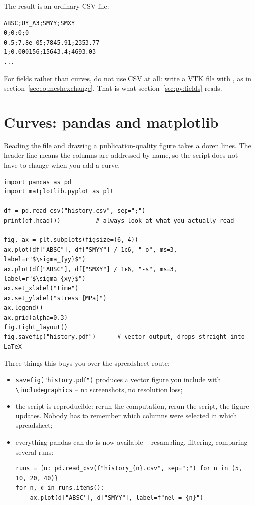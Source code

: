 \noindent The result is an ordinary CSV file:

\begin{codebox}
\begin{verbatim}
ABSC;UY_A3;SMYY;SMXY
0;0;0;0
0.5;7.8e-05;7845.91;2353.77
1;0.000156;15643.4;4693.03
...
\end{verbatim}
\end{codebox}

\noindent For fields rather than curves, do not use CSV at all: write a VTK
file with , as in section~\ref{sec:io:meshexchange}. That is
what section~\ref{sec:py:fields} reads.

\section{Curves: pandas and matplotlib}
\label{sec:py:curves}

Reading the file and drawing a publication-quality figure takes a dozen
lines. The header line means the columns are addressed by name, so the script
does not have to change when you add a curve.

\begin{codebox}
\begin{verbatim}
import pandas as pd
import matplotlib.pyplot as plt

df = pd.read_csv("history.csv", sep=";")
print(df.head())          # always look at what you actually read

fig, ax = plt.subplots(figsize=(6, 4))
ax.plot(df["ABSC"], df["SMYY"] / 1e6, "-o", ms=3, label=r"$\sigma_{yy}$")
ax.plot(df["ABSC"], df["SMXY"] / 1e6, "-s", ms=3, label=r"$\sigma_{xy}$")
ax.set_xlabel("time")
ax.set_ylabel("stress [MPa]")
ax.legend()
ax.grid(alpha=0.3)
fig.tight_layout()
fig.savefig("history.pdf")      # vector output, drops straight into LaTeX
\end{verbatim}
\end{codebox}

\noindent Three things this buys you over the spreadsheet route:

\begin{itemize}
\item \texttt{savefig("history.pdf")} produces a vector figure you include
  with \verb|\includegraphics| -- no screenshots, no resolution loss;
\item the script is reproducible: rerun the computation, rerun the script,
  the figure updates. Nobody has to remember which columns were selected in
  which spreadsheet;
\item everything pandas can do is now available -- resampling, filtering,
  comparing several runs:

\begin{codebox}
\begin{verbatim}
runs = {n: pd.read_csv(f"history_{n}.csv", sep=";") for n in (5, 10, 20, 40)}
for n, d in runs.items():
    ax.plot(d["ABSC"], d["SMYY"], label=f"nel = {n}")
\end{verbatim}
\end{codebox}
\end{itemize}

